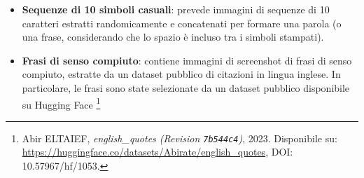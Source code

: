 \begin{itemize}
	\item \textbf{Sequenze di 10 simboli casuali}: prevede immagini di sequenze di 10 caratteri estratti randomicamente e concatenati per formare una parola (o una frase, considerando che lo spazio è incluso tra i simboli stampati).
	\item \textbf{Frasi di senso compiuto}: contiene immagini di screenshot di frasi di senso compiuto, estratte da un dataset pubblico di citazioni in lingua inglese. In particolare, le frasi sono state selezionate da un dataset pubblico disponibile su Hugging Face \footnote{Abir ELTAIEF, \textit{english\_quotes (Revision \texttt{7b544c4})}, 2023. Disponibile su: \url{https://huggingface.co/datasets/Abirate/english_quotes}, DOI: 10.57967/hf/1053.}
\end{itemize}




